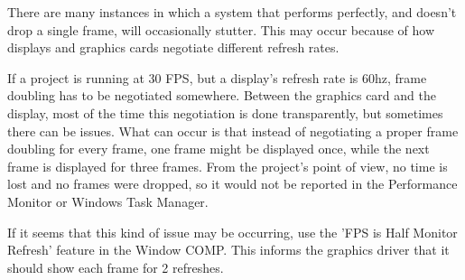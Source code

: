 \begin{fullwidth}
There are many instances in which a system that performs perfectly, and doesn't drop a single frame, will occasionally stutter. This may occur because of how displays and graphics cards negotiate different refresh rates. 

If a project is running at 30 FPS, but a display's refresh rate is 60hz, frame doubling has to be negotiated somewhere. Between the graphics card and the display, most of the time this negotiation is done transparently, but sometimes there can be issues. What can occur is that instead of negotiating a proper frame doubling for every frame, one frame might be displayed once, while the next frame is displayed for three frames. From the project's point of view, no time is lost and no frames were dropped, so it would not be reported in the Performance Monitor or Windows Task Manager. 

If it seems that this kind of issue may be occurring, use the 'FPS is Half Monitor Refresh' feature in the Window COMP. This informs the graphics driver that it should show each frame for 2 refreshes.


\end{fullwidth}
